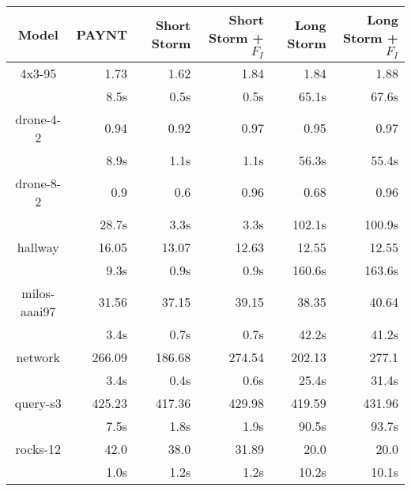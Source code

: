 \begin{table}
\begin{tabular}{|c|r|r|r|r|r|}
\hline

Model & PAYNT & Short Storm & Short Storm + $F_{I}$ & Long Storm & Long Storm + $F_{I}$ \\ \hline 

4x3-95 & 1.73 & 1.62 & 1.84 & 1.84 & 1.88 \\
 & 8.5s & 0.5s & 0.5s & 65.1s & 67.6s \\
\hline
drone-4-2 & 0.94 & 0.92 & 0.97 & 0.95 & 0.97 \\
 & 8.9s & 1.1s & 1.1s & 56.3s & 55.4s \\
\hline
drone-8-2 & 0.9 & 0.6 & 0.96 & 0.68 & 0.96 \\
 & 28.7s & 3.3s & 3.3s & 102.1s & 100.9s \\
\hline
hallway & 16.05 & 13.07 & 12.63 & 12.55 & 12.55 \\
 & 9.3s & 0.9s & 0.9s & 160.6s & 163.6s \\
\hline
milos-aaai97 & 31.56 & 37.15 & 39.15 & 38.35 & 40.64 \\
 & 3.4s & 0.7s & 0.7s & 42.2s & 41.2s \\
\hline
network & 266.09 & 186.68 & 274.54 & 202.13 & 277.1 \\
 & 3.4s & 0.4s & 0.6s & 25.4s & 31.4s \\
\hline
query-s3 & 425.23 & 417.36 & 429.98 & 419.59 & 431.96 \\
 & 7.5s & 1.8s & 1.9s & 90.5s & 93.7s \\
\hline
rocks-12 & 42.0 & 38.0 & 31.89 & 20.0 & 20.0 \\
 & 1.0s & 1.2s & 1.2s & 10.2s & 10.1s \\
\hline
\end{tabular}
\end{table}

